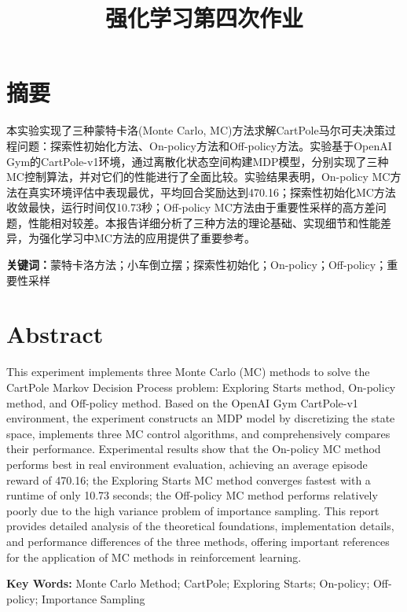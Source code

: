 \documentclass[12pt,a4paper]{article}
\title{\textbf{强化学习第四次作业}}
\author{}
\date{}
\begin{document}
\maketitle

\section*{摘要}

本实验实现了三种蒙特卡洛(Monte Carlo, MC)方法求解CartPole马尔可夫决策过程问题：探索性初始化方法、On-policy方法和Off-policy方法。实验基于OpenAI Gym的CartPole-v1环境，通过离散化状态空间构建MDP模型，分别实现了三种MC控制算法，并对它们的性能进行了全面比较。实验结果表明，On-policy MC方法在真实环境评估中表现最优，平均回合奖励达到470.16；探索性初始化MC方法收敛最快，运行时间仅10.73秒；Off-policy MC方法由于重要性采样的高方差问题，性能相对较差。本报告详细分析了三种方法的理论基础、实现细节和性能差异，为强化学习中MC方法的应用提供了重要参考。

\textbf{关键词：}蒙特卡洛方法；小车倒立摆；探索性初始化；On-policy；Off-policy；重要性采样

\section*{Abstract}

This experiment implements three Monte Carlo (MC) methods to solve the CartPole Markov Decision Process problem: Exploring Starts method, On-policy method, and Off-policy method. Based on the OpenAI Gym CartPole-v1 environment, the experiment constructs an MDP model by discretizing the state space, implements three MC control algorithms, and comprehensively compares their performance. Experimental results show that the On-policy MC method performs best in real environment evaluation, achieving an average episode reward of 470.16; the Exploring Starts MC method converges fastest with a runtime of only 10.73 seconds; the Off-policy MC method performs relatively poorly due to the high variance problem of importance sampling. This report provides detailed analysis of the theoretical foundations, implementation details, and performance differences of the three methods, offering important references for the application of MC methods in reinforcement learning.

\textbf{Key Words:} Monte Carlo Method; CartPole; Exploring Starts; On-policy; Off-policy; Importance Sampling

\newpage
\end{document}

